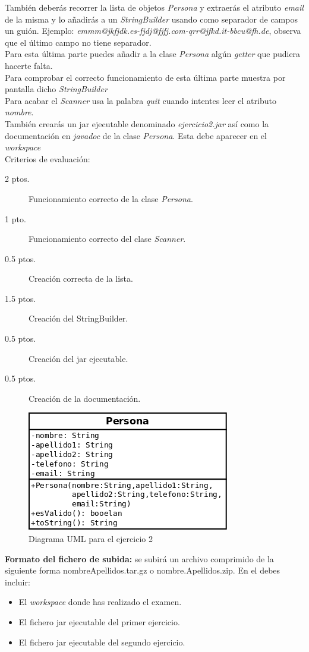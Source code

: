 \documentclass[addpoints,12pt]{exam}
\begin{document}
\begin{questions}
También deberás recorrer la lista de objetos \emph{Persona} y extraerás el atributo \emph{email} de la misma y lo añadirás a un \emph{StringBuilder} usando como separador de campos un guión. Ejemplo: \emph{emmm@jkfjdk.es-fjdj@fjfj.com-qrr@jfkd.it-bbcu@fh.de}, observa que el último campo no tiene separador. \\
Para esta última parte puedes añadir a la clase \emph{Persona} algún \emph{getter} que pudiera hacerte falta.\\
Para comprobar el correcto funcionamiento de esta última parte muestra por pantalla dicho \emph{StringBuilder}\\
Para acabar el \emph{Scanner} usa la palabra \emph{quit} cuando intentes leer el atributo \emph{nombre}.\\
También crearás un jar ejecutable denominado \emph{ejercicio2.jar} así como la documentación en \emph{javadoc} de la clase \emph{Persona}. Esta debe aparecer en el \emph{workspace}
\vspace{0.3cm}
\\
Criterios de evaluación:
\begin{description}
\item[2 ptos.] Funcionamiento correcto de la clase \emph{Persona}.
\item[1 pto.] Funcionamiento correcto del clase \emph{Scanner}.
\item[0.5 ptos.] Creación correcta de la lista.
\item[1.5 ptos.] Creación del StringBuilder.
\item[0.5 ptos.] Creación del jar ejecutable.
\item[0.5 ptos.] Creación de la documentación. 
\end{description}
\begin{figure}[h]
\centering
\includegraphics[scale=0.5]{persona.png}
\caption{Diagrama UML para el ejercicio 2}
\end{figure}
\end{questions}
\textbf{Formato del fichero de subida:} se subirá un archivo comprimido de la siguiente forma nombreApellidos.tar.gz o nombre.Apellidos.zip. En el debes incluir:
\begin{itemize}
\item El \emph{workspace} donde has realizado el examen. 
\item El fichero jar ejecutable del primer ejercicio.
\item El fichero jar ejecutable del segundo ejercicio.
\end{itemize}
\end{document}
